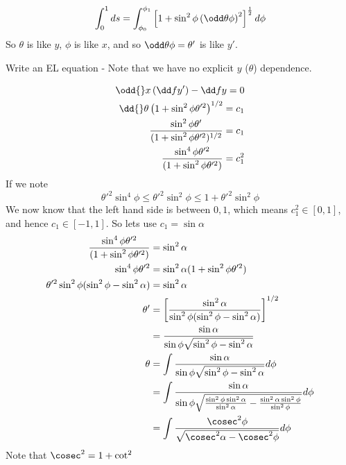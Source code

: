 \documentclass{E:/Documents/Latex/myassignment}
\begin{document}
\begin{align*}
	\int_0^1 ds &= \int_{\phi_0}^{\phi_1} \left[1 + \sin^2\phi \left(\odd \theta\phi\right)^2\right]^{\frac12} d\phi \\
\end{align*}
So $\theta$ is like $y$, $\phi$ is like $x$, and so $\odd \theta\phi = \theta'$ is like $y'$.

Write an EL equation - Note that we have no explicit $y$ ($\theta$) dependence.

\begin{align*}
	\odd{}x \left(\dd f{y'}\right) - \dd fy = 0\\
	\dd{}\theta \left(1 + \sin^2 \phi \theta'^2\right)^{1/2} = c_1\\
	\frac{\sin^2\phi \theta'}{(1+\sin^2\phi \theta'^2)^{1/2}} = c_1\\
	\frac{\sin^4\phi \theta'^2}{(1+\sin^2\phi \theta'^2)} = c_1^2\\
\end{align*}
If we note
\[\theta'^2 \sin^{4}\phi \leq \theta'^2 \sin^2\phi \leq 1 + \theta'^2 \sin^2\phi  \]
We now know that the left hand side is between $0,1$, which means $c_1^2 \in [0,1]$, and hence $c_1 \in [-1,1]$. So lets use $c_1 = \sin \alpha$
\begin{align*}
	\frac{\sin^4\phi \theta'^2}{(1+\sin^2\phi \theta'^2)}& = \sin^2 \alpha\\
	\sin^4\phi \theta'^2 &= \sin^2 \alpha (1+\sin^2\phi \theta'^2)\\
	\theta'^2 \sin^2\phi(\sin^2\phi - \sin^2 \alpha)& = \sin^2 \alpha\\
	\theta' &= \left[\frac{\sin^2 \alpha}{\sin^2\phi(\sin^2\phi - \sin^2 \alpha)}\right]^{1/2}\\
	&= \frac{\sin \alpha}{\sin \phi \sqrt{\sin^2\phi - \sin^2 \alpha}}\\
	\theta &= \int \frac{\sin \alpha}{\sin \phi \sqrt{\sin^2\phi - \sin^2 \alpha}} d\phi\\
	&= \int \frac{\sin \alpha}{\sin \phi \sqrt{\frac{\sin^2\phi\sin^2 \alpha}{\sin^2 \alpha} - \frac{\sin^2 \alpha \sin^2 \phi}{\sin^2 \phi}}} d\phi\\
	&= \int \frac{\cosec^2\phi}{\sqrt{\cosec^2 \alpha - \cosec^2 \phi}} d\phi
\end{align*}
Note that $\cosec^2 = 1+ \cot^2$
\end{document}
